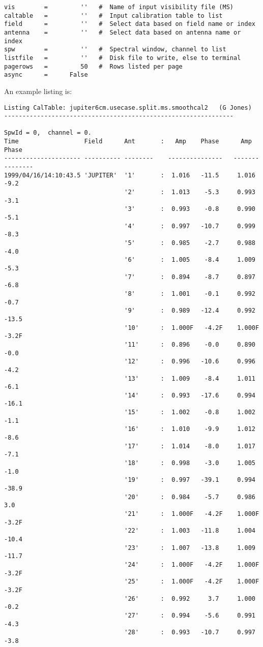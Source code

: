 {\begin{verbatim}
vis        =         ''   #  Name of input visibility file (MS)
caltable   =         ''   #  Input calibration table to list
field      =         ''   #  Select data based on field name or index
antenna    =         ''   #  Select data based on antenna name or index
spw        =         ''   #  Spectral window, channel to list
listfile   =         ''   #  Disk file to write, else to terminal
pagerows   =         50   #  Rows listed per page
async      =      False   
\end{verbatim}
\normalsize

An example listing is:
\small
\begin{verbatim}
Listing CalTable: jupiter6cm.usecase.split.ms.smoothcal2   (G Jones) 
---------------------------------------------------------------

SpwId = 0,  channel = 0.
Time                  Field      Ant       :   Amp    Phase      Amp    Phase    
--------------------- ---------- --------    ---------------   ---------------
1999/04/16/14:10:43.5 'JUPITER'  '1'       :  1.016   -11.5     1.016    -9.2    
                                 '2'       :  1.013    -5.3     0.993    -3.1    
                                 '3'       :  0.993    -0.8     0.990    -5.1    
                                 '4'       :  0.997   -10.7     0.999    -8.3    
                                 '5'       :  0.985    -2.7     0.988    -4.0    
                                 '6'       :  1.005    -8.4     1.009    -5.3    
                                 '7'       :  0.894    -8.7     0.897    -6.8    
                                 '8'       :  1.001    -0.1     0.992    -0.7    
                                 '9'       :  0.989   -12.4     0.992   -13.5    
                                 '10'      :  1.000F   -4.2F    1.000F   -3.2F   
                                 '11'      :  0.896    -0.0     0.890    -0.0    
                                 '12'      :  0.996   -10.6     0.996    -4.2    
                                 '13'      :  1.009    -8.4     1.011    -6.1    
                                 '14'      :  0.993   -17.6     0.994   -16.1    
                                 '15'      :  1.002    -0.8     1.002    -1.1    
                                 '16'      :  1.010    -9.9     1.012    -8.6    
                                 '17'      :  1.014    -8.0     1.017    -7.1    
                                 '18'      :  0.998    -3.0     1.005    -1.0    
                                 '19'      :  0.997   -39.1     0.994   -38.9    
                                 '20'      :  0.984    -5.7     0.986     3.0    
                                 '21'      :  1.000F   -4.2F    1.000F   -3.2F   
                                 '22'      :  1.003   -11.8     1.004   -10.4    
                                 '23'      :  1.007   -13.8     1.009   -11.7    
                                 '24'      :  1.000F   -4.2F    1.000F   -3.2F   
                                 '25'      :  1.000F   -4.2F    1.000F   -3.2F   
                                 '26'      :  0.992     3.7     1.000    -0.2    
                                 '27'      :  0.994    -5.6     0.991    -4.3    
                                 '28'      :  0.993   -10.7     0.997    -3.8    


\end{verbatim}}

